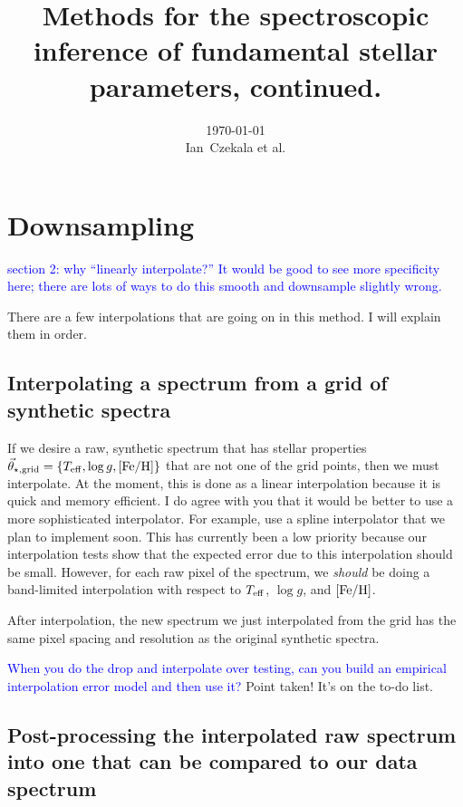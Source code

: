 \documentclass[preprint]{aastex} %
\newcommand{\vt}{\vec{\theta}}
\newcommand{\vg}{\vt_{\star, {\rm grid}}}
\newcommand{\hcom}[1]{ \textcolor{Blue}{#1}}
\begin{document}
\title{Methods for the spectroscopic inference of fundamental stellar parameters, continued.}
\author{\today{}\\
\medskip
Ian~Czekala et al.
}


\section{Downsampling}

\hcom{section 2: why ``linearly interpolate?'' It would be good to see more specificity here; there are lots of ways to do this smooth and downsample slightly wrong.}

There are a few interpolations that are going on in this method. I will explain them in order.

\subsection{Interpolating a spectrum from a grid of synthetic spectra}
If we desire a raw, synthetic spectrum that has stellar properties $\vg = \{T_{\rm eff}, \log g, [{\rm Fe}/{\rm H}]\}$ that are not one of the grid points, then we must interpolate. At the moment, this is done as a linear interpolation because it is quick and memory efficient. I do agree with you that it would be better to use a more sophisticated interpolator. For example, \citet{hwd+13} use a spline interpolator that we plan to implement soon. This has currently been a low priority because our interpolation tests show that the expected error due to this interpolation should be small. However, for each raw pixel of the spectrum, we \emph{should} be doing a band-limited interpolation with respect to $T_{\rm eff}$, $\log g$, and $[{\rm Fe}/{\rm H}]$.

After interpolation, the new spectrum we just interpolated from the grid has the same pixel spacing and resolution as the original synthetic spectra.

\hcom{When you do the drop and interpolate over testing, can you build an empirical interpolation error model and then use it?}
Point taken! It's on the to-do list.

\subsection{Post-processing the interpolated raw spectrum into one that can be compared to our data spectrum}
\end{document}
